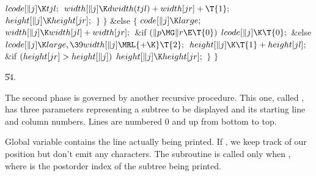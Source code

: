 ${}\\{lcode}[\|j]\K\\{tjl};{}$\6
${}\\{width}[\|j]\K\\{dwidth}(\\{tjl})+\\{width}[\\{jr}]+\T{1};{}$\6
${}\\{height}[\|j]\K\\{height}[\\{jr}];{}$\6
\4${}\}{}$\2\6
\4${}\}{}$\2\6
\&{else}\5
${}\{{}$\1\6
${}\\{code}[\|j]\K\\{large};{}$\6
${}\\{width}[\|j]\K\\{width}[\\{jl}]+\\{width}[\\{jr}];{}$\6
\&{if} ${}(\|p\MG\|r\E\T{0}){}$\1\5
${}\\{lcode}[\|j]\K\T{0};{}$\2\6
\&{else}\1\5
${}\\{lcode}[\|j]\K\\{large},\39\\{width}[\|j]\MRL{+{\K}}\T{2};{}$\2\6
${}\\{height}[\|j]\K\T{1}+\\{height}[\\{jl}];{}$\6
\&{if} ${}(\\{height}[\\{jr}]>\\{height}[\|j]){}$\1\5
${}\\{height}[\|j]\K\\{height}[\\{jr}];{}$\2\6
\4${}\}{}$\2\6
\4${}\}{}$\2\par
\U54.\fi

The second phase is governed by another recursive procedure.
This
one, called , has three parameters representing a subtree
to be displayed and its starting line and column numbers. Lines are
numbered 0 and up from bottom to top.

Global variable  contains the line actually being printed. If ,
we keep track of our position but don't emit any characters. The
subroutine is called only when , where  is the
postorder index of the subtree being printed.

